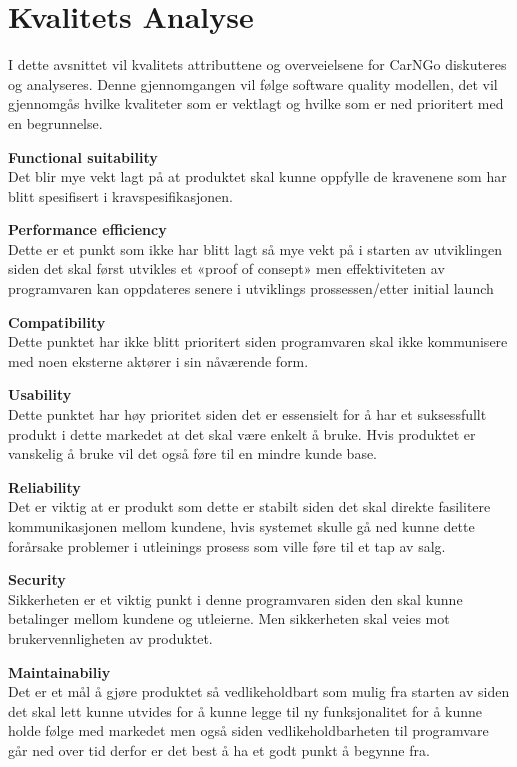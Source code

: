 \documentclass[Kravspecifikation/Kravspec_Main.tex]{subfiles}
\begin{document}
\section{Kvalitets Analyse}
I dette avsnittet vil kvalitets attributtene og overveielsene for CarNGo diskuteres og analyseres. Denne gjennomgangen vil følge software quality modellen, det vil gjennomgås hvilke kvaliteter som er vektlagt og hvilke som er ned prioritert med en begrunnelse.

\textbf{Functional suitability}\\
Det blir mye vekt lagt på at produktet skal kunne oppfylle de kravenene som har blitt spesifisert i kravspesifikasjonen.

\textbf{Performance efficiency}\\
Dette er et punkt som ikke har blitt lagt så mye vekt på i starten av utviklingen siden det skal først utvikles et «proof of consept» men effektiviteten av programvaren kan oppdateres senere i utviklings prossessen/etter initial launch

\textbf{Compatibility}\\
Dette punktet har ikke blitt prioritert siden programvaren skal ikke kommunisere med noen eksterne aktører i sin nåværende form.

\textbf{Usability}\\
Dette punktet har høy prioritet siden det er essensielt for å har et suksessfullt produkt i dette markedet at det skal være enkelt å bruke. Hvis produktet er vanskelig å bruke vil det også føre til en mindre kunde base.

\textbf{Reliability}\\
Det er viktig at er produkt som dette er stabilt siden det skal direkte fasilitere kommunikasjonen mellom kundene, hvis systemet skulle gå ned kunne dette forårsake problemer i utleinings prosess som ville føre til et tap av salg.

\textbf{Security}\\
Sikkerheten er et viktig punkt i denne programvaren siden den skal kunne betalinger mellom kundene og utleierne. Men sikkerheten skal veies mot brukervennligheten av produktet.

\textbf{Maintainabiliy}\\
Det er et mål å gjøre produktet så vedlikeholdbart som mulig fra starten av siden det skal lett kunne utvides for å kunne legge til ny funksjonalitet for å kunne holde følge med markedet men også siden vedlikeholdbarheten til programvare går ned over tid derfor er det best å ha et godt punkt å begynne fra.
\end{document}

